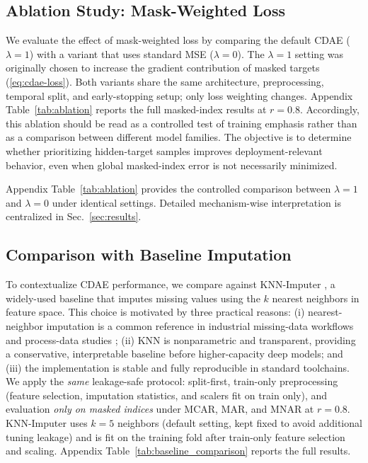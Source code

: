 \subsection{Ablation Study: Mask-Weighted Loss}\label{sec:ablation}

We evaluate the effect of mask-weighted loss by comparing the default CDAE ($\lambda=1$) with a variant that uses standard MSE ($\lambda=0$). The $\lambda=1$ setting was originally chosen to increase the gradient contribution of masked targets (\eqref{eq:cdae-loss}). Both variants share the same architecture, preprocessing, temporal split, and early-stopping setup; only loss weighting changes. Appendix Table~\ref{tab:ablation} reports the full masked-index results at $r=0.8$.
Accordingly, this ablation should be read as a controlled test of training emphasis rather than as a comparison between different model families. The objective is to determine whether prioritizing hidden-target samples improves deployment-relevant behavior, even when global masked-index error is not necessarily minimized.

Appendix Table~\ref{tab:ablation} provides the controlled comparison between $\lambda=1$ and $\lambda=0$ under identical settings. Detailed mechanism-wise interpretation is centralized in Sec.~\ref{sec:results}.


\subsection{Comparison with Baseline Imputation}\label{sec:baseline}

To contextualize CDAE performance, we compare against KNN-Imputer \cite{pedregosa2011scikit}, a widely-used baseline that imputes missing values using the $k$ nearest neighbors in feature space. This choice is motivated by three practical reasons: (i) nearest-neighbor imputation is a common reference in industrial missing-data workflows and process-data studies \cite{carbery2022missingness, pirehgalin2018estimation, zhang2024missing}; (ii) KNN is nonparametric and transparent, providing a conservative, interpretable baseline before higher-capacity deep models; and (iii) the implementation is stable and fully reproducible in standard toolchains. We apply the \emph{same} leakage-safe protocol: split-first, train-only preprocessing (feature selection, imputation statistics, and scalers fit on train only), and evaluation \emph{only on masked indices} under MCAR, MAR, and MNAR at $r=0.8$. KNN-Imputer uses $k=5$ neighbors (default setting, kept fixed to avoid additional tuning leakage) and is fit on the training fold after train-only feature selection and scaling. Appendix Table~\ref{tab:baseline_comparison} reports the full results.

